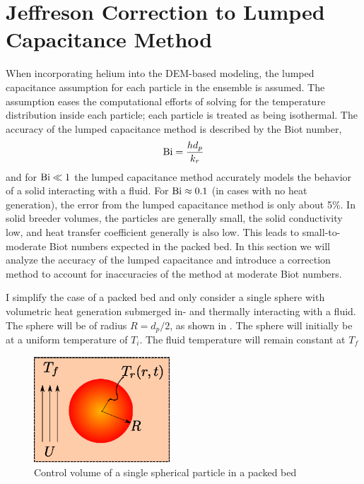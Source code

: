 \section{Jeffreson Correction to Lumped Capacitance Method}\label{sec:ht-jeffreson-correction}
When incorporating helium into the DEM-based modeling, the lumped capacitance assumption for each particle in the ensemble is assumed. The assumption eases the computational efforts of solving for the temperature distribution inside each particle; each particle is treated as being isothermal. The accuracy of the lumped capacitance method is described by the Biot number,
\begin{equation}
     \mathrm{Bi} = \frac{hd_p}{k_r}
\end{equation} 
and for $\mathrm{Bi} \ll 1$ the lumped capacitance method accurately models the behavior of a solid interacting with a fluid. For $\mathrm{Bi} \approx 0.1$ (in cases with no heat generation), the error from the lumped capacitance method is only about 5\%. In solid breeder volumes, the particles are generally small, the solid conductivity low, and heat transfer coefficient generally is also low. This leads to small-to-moderate Biot numbers expected in the packed bed. In this section we will analyze the accuracy of the lumped capacitance and introduce a correction method to account for inaccuracies of the method at moderate Biot numbers.

I simplify the case of a packed bed and only consider a single sphere with volumetric heat generation submerged in- and thermally interacting with a fluid. The sphere will be of radius $R=d_p/2$, as shown in . The sphere will initially be at a uniform temperature of $T_i$. The fluid temperature will remain constant at $T_f$

\begin{figure}[ht]
	\centering
		\includegraphics[width=2in]{figures/ParticleControlVolume}
	\caption[Control volume of single spherical particle in a packed bed]{Control volume of a single spherical particle in a packed bed}
	\label{fig:ParticleControlVolume}
\end{figure}


